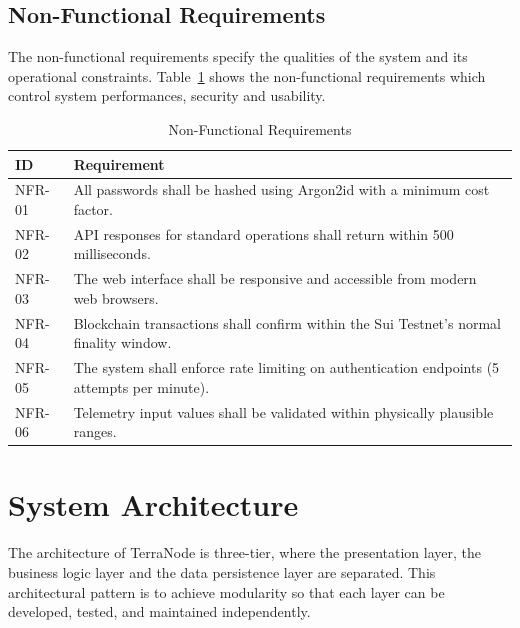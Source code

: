\clearpage
\subsection{Non-Functional Requirements}

The non-functional requirements specify the qualities of the system and its operational constraints. Table~\ref{tab:nonfunctional_req} shows the non-functional requirements which control system performances, security and usability.

\begin{table}[H]
\centering
\small
\singlespacing
\renewcommand{\arraystretch}{1.15}
\caption{Non-Functional Requirements}
\label{tab:nonfunctional_req}
\begin{tabularx}{\textwidth}{|l|>{\raggedright\arraybackslash}X|}
\hline
\textbf{ID} & \textbf{Requirement} \\
\hline
NFR-01 & All passwords shall be hashed using Argon2id with a minimum cost factor. \\
\hline
NFR-02 & API responses for standard operations shall return within 500 milliseconds. \\
\hline
NFR-03 & The web interface shall be responsive and accessible from modern web browsers. \\
\hline
NFR-04 & Blockchain transactions shall confirm within the Sui Testnet's normal finality window. \\
\hline
NFR-05 & The system shall enforce rate limiting on authentication endpoints (5 attempts per minute). \\
\hline
NFR-06 & Telemetry input values shall be validated within physically plausible ranges. \\
\hline
\end{tabularx}
\end{table}

\section{System Architecture}

The architecture of TerraNode is three-tier, where the presentation layer, the business logic layer and the data persistence layer are separated. This architectural pattern is to achieve modularity so that each layer can be developed, tested, and maintained independently.

